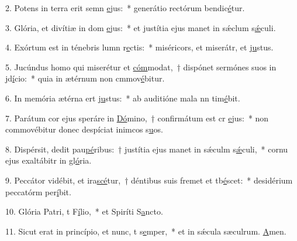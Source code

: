 2. Potens in terra erit semn \uline{e}jus:~* generátio rectórum bendic\uline{é}tur.\par 
3. Glória, et divítiæ in dom \uline{e}jus:~* et justítia ejus manet in sǽclum s\uline{ǽ}culi.\par 
4. Exórtum est in ténebris lumn r\uline{e}ctis:~* miséricors, et miserátr, et j\uline{u}stus.\par 
5. Jucúndus homo qui miserétur et \uline{cóm}modat,~† dispónet sermónes suos in jd\uline{í}cio:~* quia in ætérnum non cmmov\uline{é}bitur.\par 
6. In memória ætérna ert j\uline{u}stus:~* ab auditióne mala nn tim\uline{é}bit.\par 
7. Parátum cor ejus speráre in \uline{Dó}mino,~† confirmátum est cr \uline{e}jus:~* non commovébitur donec despíciat inimcos s\uline{u}os.\par 
8. Dispérsit, dedit pau\uline{pé}ribus:~† justítia ejus manet in sǽculm s\uline{ǽ}culi,~* cornu ejus exaltábitr in gl\uline{ó}ria.\par 
9. Peccátor vidébit, et ira\uline{scé}tur,~† déntibus suis fremet et tb\uline{é}scet:~* desidérium peccatórm per\uline{í}bit.\par 
10. Glória Patri, t F\uline{í}lio,~* et Spiríti S\uline{a}ncto.\par 
11. Sicut erat in princípio, et nunc, t s\uline{e}mper,~* et in sǽcula sæculrum. \uline{A}men.\par 
